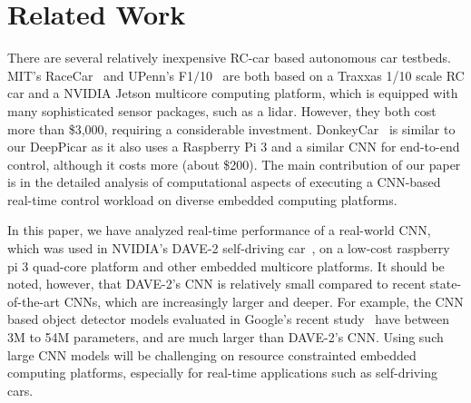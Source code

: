 \section{Related Work}\label{sec:related}


There are several relatively inexpensive RC-car based autonomous car
testbeds. MIT's RaceCar~\cite{shin2017project} and UPenn's
F1$/$10~\cite{upennf1tenth} are both based on a Traxxas 1/10 scale RC
car and a NVIDIA Jetson multicore computing platform, which
is equipped with many sophisticated sensor packages, such as a lidar.
However, they both cost more than \$3,000, requiring a considerable
investment. DonkeyCar~\cite{donkeycar} is similar to our DeepPicar as
it also uses a Raspberry Pi 3 and a similar CNN for end-to-end
control, although it costs more (about \$200).
The main contribution of our paper is in the detailed analysis of
computational aspects of executing a CNN-based real-time control
workload on diverse embedded computing platforms.

In this paper, we have analyzed real-time performance of a real-world
CNN, which was used in NVIDIA's DAVE-2 self-driving
car~\cite{Bojarski2016}, on a low-cost raspberry pi 3 quad-core 
platform and other embedded multicore platforms. It should be noted, 
however, that DAVE-2's CNN is relatively small compared
to recent state-of-the-art CNNs, which are increasingly larger and
deeper. For example, the CNN based object detector models evaluated in
Google's recent study~\cite{huang2017speed} have between 3M to 54M
parameters, and are much larger than DAVE-2's CNN.
Using such large CNN models will be challenging on
resource constrainted embedded computing platforms, especially for
real-time applications such as self-driving cars.

